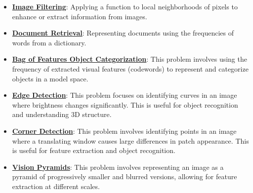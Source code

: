 \documentclass{article}%
\begin{document}
\begin{itemize}[leftmargin=*]
\item \href{https://purdue.brightspace.com/d2l/common/assets/pdfjs-d2l-dist/1.0.14-legacy/web/viewer.html?file=\%2Fcontent\%2Fenforced\%2F1095467-wl.202510.CS.24300.001\%2F07L2-Vision.pdf\%3Fou\%3D1095467\&lang=en-us\&container=d2l-fileviewer-rendered-pdf\&fullscreen=d2l-fileviewer-rendered-pdf-dialog\&height=667#page=49}{\textbf{Image Filtering}}: Applying a function to local neighborhoods of pixels to enhance or extract information from images.%
\item \href{https://purdue.brightspace.com/d2l/common/assets/pdfjs-d2l-dist/1.0.14-legacy/web/viewer.html?file=\%2Fcontent\%2Fenforced\%2F1095467-wl.202510.CS.24300.001\%2F07L2-Vision.pdf\%3Fou\%3D1095467\&lang=en-us\&container=d2l-fileviewer-rendered-pdf\&fullscreen=d2l-fileviewer-rendered-pdf-dialog\&height=667#page=20}{\textbf{Document Retrieval}}: Representing documents using the frequencies of words from a dictionary.%
\item \href{https://purdue.brightspace.com/d2l/common/assets/pdfjs-d2l-dist/1.0.14-legacy/web/viewer.html?file=\%2Fcontent\%2Fenforced\%2F1095467-wl.202510.CS.24300.001\%2F08L2-Feature Extraction.pdf\%3Fou\%3D1095467\&lang=en-us\&container=d2l-fileviewer-rendered-pdf\&fullscreen=d2l-fileviewer-rendered-pdf-dialog\&height=667#page=3}{\textbf{Bag of Features Object Categorization}}: This problem involves using the frequency of extracted visual features (codewords) to represent and categorize objects in a model space.%
\item \href{https://purdue.brightspace.com/d2l/common/assets/pdfjs-d2l-dist/1.0.14-legacy/web/viewer.html?file=\%2Fcontent\%2Fenforced\%2F1095467-wl.202510.CS.24300.001\%2F08L2-Feature Extraction.pdf\%3Fou\%3D1095467\&lang=en-us\&container=d2l-fileviewer-rendered-pdf\&fullscreen=d2l-fileviewer-rendered-pdf-dialog\&height=667#page=4}{\textbf{Edge Detection}}: This problem focuses on identifying curves in an image where brightness changes significantly. This is useful for object recognition and understanding 3D structure.%
\item \href{https://purdue.brightspace.com/d2l/common/assets/pdfjs-d2l-dist/1.0.14-legacy/web/viewer.html?file=\%2Fcontent\%2Fenforced\%2F1095467-wl.202510.CS.24300.001\%2F08L2-Feature Extraction.pdf\%3Fou\%3D1095467\&lang=en-us\&container=d2l-fileviewer-rendered-pdf\&fullscreen=d2l-fileviewer-rendered-pdf-dialog\&height=667#page=20}{\textbf{Corner Detection}}: This problem involves identifying points in an image where a translating window causes large differences in patch appearance. This is useful for feature extraction and object recognition.%
\item \href{https://purdue.brightspace.com/d2l/common/assets/pdfjs-d2l-dist/1.0.14-legacy/web/viewer.html?file=\%2Fcontent\%2Fenforced\%2F1095467-wl.202510.CS.24300.001\%2F08L2-Feature Extraction.pdf\%3Fou\%3D1095467\&lang=en-us\&container=d2l-fileviewer-rendered-pdf\&fullscreen=d2l-fileviewer-rendered-pdf-dialog\&height=667#page=30}{\textbf{Vision Pyramids}}: This problem involves representing an image as a pyramid of progressively smaller and blurred versions, allowing for feature extraction at different scales.%
\end{itemize}
\end{document}
